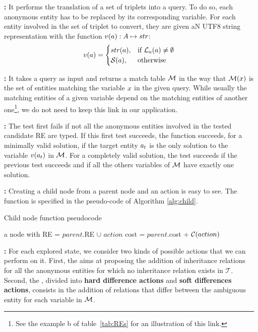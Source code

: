 \textbf{\toquery: }
It performs the translation of a set of triplets into a \sparql{} query. To do so, each anonymous entity has to be replaced by its corresponding variable. For each entity involved in the set of triplet to convert, they are given aN UTF8 string representation with the function $v(a): A \mapsto str$: 
\[ 
    v(a) = 
    \begin{cases}
        str(a),& \text{if } \mathcal{L}_a(a) \neq \emptyset\\
        \mathcal{S}(a),& \text{otherwise}
    \end{cases} 
\]

\textbf{\sparqlresult: }
It takes a \sparql{} query as input and returns a match table $\mathcal{M}$ in the way that $\mathcal{M}(x)$ is the set of entities matching the variable $x$ in the given query. While usually the matching entities of a given variable depend on the matching entities of another one\footnote{See the example b of table~\ref{tab:REs} for an illustration of this link.}, we do not need to keep this link in our application.

\textbf{\goaltest: }
The test first fails if not all the anonymous entities involved in the tested candidate RE are typed. If this first test succeeds, the function succeeds, for a minimally valid solution, if the target entity $a_t$ is the only solution to the variable $v(a_t)$ in $\mathcal{M}$. For a completely valid solution, the test succeeds if the previous test succeeds and if all the others variables of $\mathcal{M}$ have exactly one solution.

\textbf{\createchild: } 
Creating a child node from a parent node and an action is easy to see. The \createchild function is specified in the pseudo-code of Algorithm \ref{alg:child}. 

\begin{algorithm}[H]
\caption{\label{alg:child} Child node function pseudocode}
\begin{algorithmic}
    \State \Return a node with
    \State RE = $parent$.RE $\cup$ $action$
    \State cost = $parent$.cost + $\mathcal{C}(action)$
\EndFunction
\end{algorithmic}
\end{algorithm}

\textbf{\actions: }
For each explored state, we consider two kinds of possible actions that we can perform on it. First, the \typingactions{} aims at proposing the addition of inheritance relations for all the anonymous entities for which no inheritance relation exists in $\mathcal{T}$. Second, the \differenceactions{}, divided into \textbf{hard difference actions} and \textbf{soft differences actions}, consists in the addition of relations that differ between the ambiguous entity for each variable in $\mathcal{M}$.

